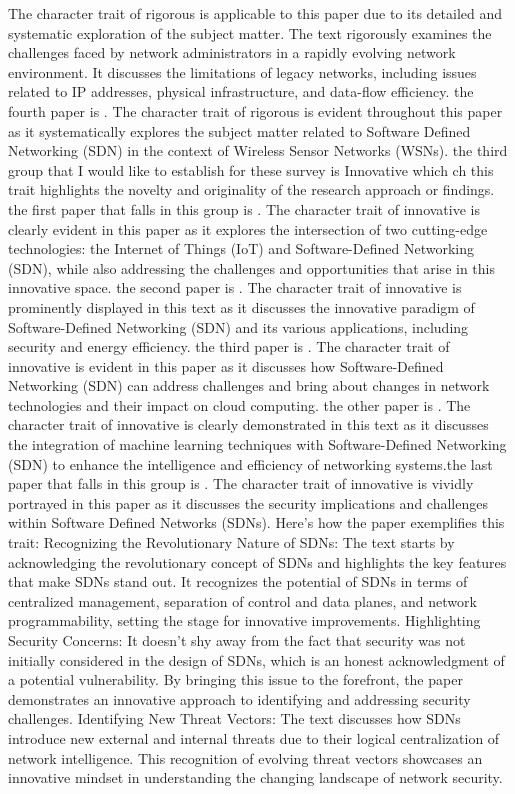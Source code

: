 \documentclass{article}
\begin{document}
The character trait of rigorous is applicable to this paper due to its detailed and systematic exploration of the subject matter. The text rigorously examines the challenges faced by network administrators in a rapidly evolving network environment. It discusses the limitations of legacy networks, including issues related to IP addresses, physical infrastructure, and data-flow efficiency. the fourth paper is \cite{ndiaye2017software}. The character trait of rigorous is evident throughout this paper as it systematically explores the subject matter related to Software Defined Networking (SDN) in the context of Wireless Sensor Networks (WSNs).
the third group that I would like to establish for these survey is Innovative which ch this trait highlights the novelty and originality of the research approach or findings.
the first paper that falls in this group is \cite{bera2017software}.  
The character trait of innovative is clearly evident in this paper as it explores the intersection of two cutting-edge technologies: the Internet of Things (IoT) and Software-Defined Networking (SDN), while also addressing the challenges and opportunities that arise in this innovative space. the second paper is \cite{rawat2016software}. The character trait of innovative is prominently displayed in this text as it discusses the innovative paradigm of Software-Defined Networking (SDN) and its various applications, including security and energy efficiency.
the third paper is \cite{horvath2015literature}. 
The character trait of innovative is evident in this paper as it discusses how Software-Defined Networking (SDN) can address challenges and bring about changes in network technologies and their impact on cloud computing.
the other paper is \cite{xie2018survey}. The character trait of innovative is clearly demonstrated in this text as it discusses the integration of machine learning techniques with Software-Defined Networking (SDN) to enhance the intelligence and efficiency of networking systems.the last paper that falls in this group is \cite{akhunzada2016secure}. The character trait of innovative is vividly portrayed in this paper as it discusses the security implications and challenges within Software Defined Networks (SDNs). Here's how the paper exemplifies this trait: Recognizing the Revolutionary Nature of SDNs: The text starts by acknowledging the revolutionary concept of SDNs and highlights the key features that make SDNs stand out. It recognizes the potential of SDNs in terms of centralized management, separation of control and data planes, and network programmability, setting the stage for innovative improvements. Highlighting Security Concerns: It doesn't shy away from the fact that security was not initially considered in the design of SDNs, which is an honest acknowledgment of a potential vulnerability. By bringing this issue to the forefront, the paper demonstrates an innovative approach to identifying and addressing security challenges. Identifying New Threat Vectors: The text discusses how SDNs introduce new external and internal threats due to their logical centralization of network intelligence. This recognition of evolving threat vectors showcases an innovative mindset in understanding the changing landscape of network security.
\end{document}

